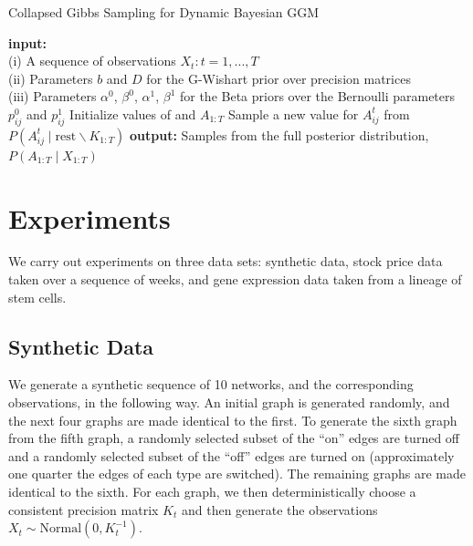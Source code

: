 \documentclass{article}
\begin{document}
\begin{algorithm}[h!tbp]
\caption{Collapsed Gibbs Sampling for Dynamic Bayesian GGM}
\label{alg:gibbs}
\begin{algorithmic}[1]
\STATE \textbf{input:} \\(i) A sequence of observations $X_t : t = 1,...,T$ \\(ii) Parameters $b$ and $D$ for the G-Wishart prior over precision matrices \\(iii) Parameters $\alpha^0$, $\beta^0$, $\alpha^1$, $\beta^1$ for the Beta priors over the Bernoulli parameters $p_{ij}^0$ and $p_{ij}^1$ %
\STATE Initialize values of and $A_{1:T}$
\STATE Sample a new value for $A_{ij}^t$ from $P(A_{ij}^t \mid \text{rest} \backslash K_{1:T})$
\ENDFOR
\ENDFOR
\ENDWHILE
\STATE \textbf{output:} Samples from the full posterior distribution, $P(A_{1:T} \mid X_{1:T})$
\end{algorithmic}
\label{alg:gibbs}
\end{algorithm}

\section{Experiments}
\label{sec:exp}

We carry out experiments on three data sets: synthetic data, stock price data taken over a sequence of weeks, and gene expression data taken from a lineage of stem cells.

\subsection{Synthetic Data}
We generate a synthetic sequence of 10 networks, and the corresponding observations, in the following way. An initial graph is generated randomly, and the next four graphs are made identical to the first. To generate the sixth graph from the fifth graph, a randomly selected subset of the ``on'' edges are turned off and a randomly selected subset of the ``off'' edges are turned on (approximately one quarter the edges of each type are switched). The remaining graphs are made identical to the sixth.  
For each graph, we then deterministically choose a consistent precision matrix $K_t$ and then generate the observations $X_t \sim \text{Normal}(0,K_{t}^{-1})$.
\end{document}
